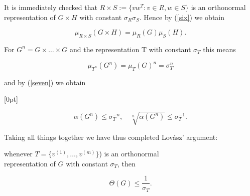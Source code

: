 It is immediately checked that $R \times S := \{vw^T : v \in R, w \in S\}$ is an
orthonormal representation of $G \times H$ with constant $\sigma_R \sigma_S$. Hence by (\ref{six}) 
we obtain 

\[
\mu_{R \times S}(G \times H) = \mu_{R}(G)\mu_{S}(H).
\]

For $G^n = G \times \ldots \times G$ and the representation T with constant $\sigma_T$ this
means 

\[
\mu_{T^n}(G^n) = \mu_{T}(G)^n = \sigma_{T}^n
\]

and by (\ref{seven}) we obtain

[0pt]

\[
\alpha(G^n) \leq \sigma_{T}^{-n},  \quad   \sqrt[n]{\alpha(G^n)} \leq \sigma_{T}^{-1}.
\]

Taking all things together we have thus completed Lov\'asz' argument: 


\begin{thm}\label{theorem}
whenever $T = \{v^{(1)}, \ldots, v^{(m)}\}$) is an orthonormal\\ 
representation of $G$ with constant $\sigma_T$, then

\begin{equation}
    \Theta(G) \leq {\frac{1}{\sigma_T}}. \label{eight}
\end{equation}

\end{thm}

